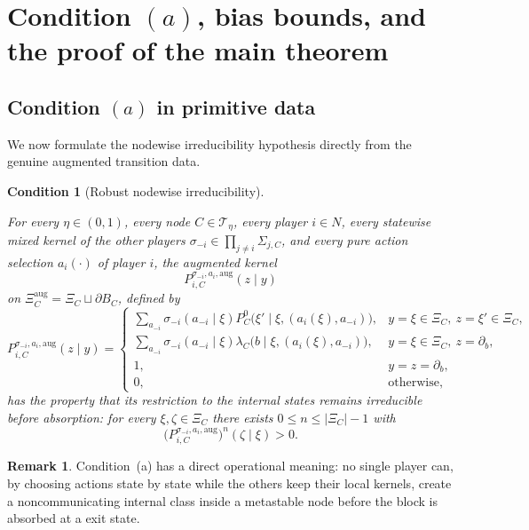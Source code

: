 \documentclass[12pt]{article}
\newtheorem{condition}[theorem]{Condition}
\theoremstyle{definition}
\newtheorem{remark}[theorem]{Remark}
\newcommand{\1}{\mathbf{1}}
\newcommand{\cT}{\mathcal{T}}
\begin{document}
\section{Condition \texorpdfstring{$(a)$}{(a)}, bias bounds, and the proof of the main theorem}
\label{sec:proof-main}

\subsection{Condition \texorpdfstring{$(a)$}{(a)} in primitive data}

We now formulate the nodewise irreducibility hypothesis directly from the genuine
augmented transition data.

\begin{condition}[Robust nodewise irreducibility]
\label{cond:a}

For every $\eta\in(0,1)$, every node $C\in\cT_\eta$, every player $i\in N$, every
statewise mixed kernel of the other players
$\sigma_{-i}\in\prod_{j\ne i}\Sigma_{j,C}$, and every pure action selection
$a_i(\cdot)$ of player $i$, the augmented kernel
\[
P_{i,C}^{\sigma_{-i},a_i,\mathrm{aug}}(z\mid y)
\]
on $\Xi_C^{\mathrm{aug}}=\Xi_C\sqcup\partial B_C$, defined by
\[
P_{i,C}^{\sigma_{-i},a_i,\mathrm{aug}}(z\mid y)
=
\begin{cases}
\displaystyle
\sum_{a_{-i}}\sigma_{-i}(a_{-i}\mid\xi)
P_C^0\bigl(\xi'\mid\xi,(a_i(\xi),a_{-i})\bigr),
& y=\xi\in\Xi_C,\ z=\xi'\in\Xi_C,\\[0.7em]
\displaystyle
\sum_{a_{-i}}\sigma_{-i}(a_{-i}\mid\xi)
\lambda_C\bigl(b\mid\xi,(a_i(\xi),a_{-i})\bigr),
& y=\xi\in\Xi_C,\ z=\partial_b,\\[0.7em]
1, & y=z=\partial_b,\\
0, & \text{otherwise,}
\end{cases}
\]
has the property that its restriction to the internal states remains irreducible
before absorption: for every $\xi,\zeta\in\Xi_C$ there exists
$0\le n\le |\Xi_C|-1$ with
\[
\bigl(P_{i,C}^{\sigma_{-i},a_i,\mathrm{aug}}\bigr)^n(\zeta\mid\xi)>0.
\]
\end{condition}

\begin{remark}
Condition~\textnormal{(a)} has a direct operational meaning: no single player can,
by choosing actions state by state while the others keep their local kernels,
create a noncommunicating internal class inside a metastable node before the block
is absorbed at a exit state.
\end{remark}
\end{document}
